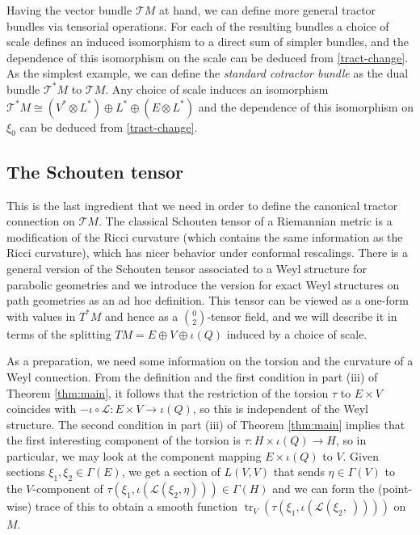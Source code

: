 \documentclass[11pt]{amsart}
\newcommand{\tr}{\operatorname{tr}}
\numberwithin{proposition}{section}
\numberwithin{equation}{section}
\begin{document}
Having the vector bundle $\mathcal{T}M$ at hand, we can define more general tractor bundles via tensorial operations. For each of the resulting bundles a choice of scale defines an induced isomorphism to a direct sum of simpler bundles, and the dependence of this isomorphism on the scale can be deduced from \eqref{tract-change}. As the simplest example, we can define the \textit{standard cotractor bundle} as the dual bundle $\mathcal{T}^*M$ to $\mathcal{T}M$. Any choice of scale induces an isomorphism $\mathcal{T}^*M\cong (V^*\otimes L^*)\oplus L^*\oplus (E\otimes L^*)$ and the dependence of this isomorphism on $\xi_0$ can be deduced from \eqref{tract-change}.  

\subsection{The Schouten tensor}\label{4.4}
This is the last ingredient that we need in order to define the canonical tractor connection on $\mathcal{T}M$. 
The classical Schouten tensor of a Riemannian metric is a modification of the Ricci curvature (which contains the same information as the Ricci curvature), which has nicer behavior under conformal rescalings. There is a general version of the Schouten tensor associated to a Weyl structure for parabolic geometries and we introduce the version for exact Weyl structures on path geometries as an ad hoc definition. This tensor can be viewed as a one-form with values in $T^*M$ and hence as a $\binom{0}{2}$-tensor field, and we will describe it in terms of the splitting $TM=E\oplus V\oplus\iota(Q)$ induced by a choice of scale. 

As a preparation, we need some information on the torsion and the curvature of a Weyl connection. From the definition and the first condition in part (iii) of Theorem \ref{thm:main}, it follows that the restriction of the torsion $\tau$ to $E\times V$ coincides with $-\iota\circ\mathcal L:E\times V\to\iota(Q)$, so this is independent of the Weyl structure. The second condition in part (iii) of Theorem \ref{thm:main} implies that the first interesting component of the torsion is $\tau:H\times \iota(Q)\to H$, so in particular, we may look at the component mapping $E\times\iota(Q)$ to $V$. Given sections $\xi_1,\xi_2\in\Gamma (E)$, we get a section of $L(V,V)$ that sends $\eta\in\Gamma(V)$ to the $V$-component of $\tau(\xi_1,\iota(\mathcal L(\xi_2,\eta)))\in\Gamma(H)$ and we can form the (point-wise) trace of this to obtain a smooth function $\tr_V(\tau(\xi_1,\iota(\mathcal L(\xi_2,\ ))))$ on $M$.  
\end{document}
